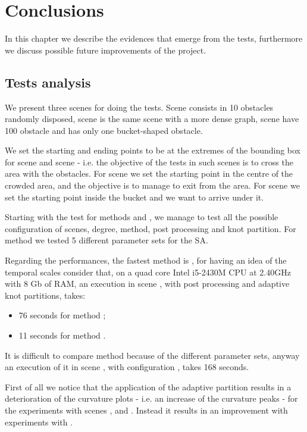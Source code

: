 \documentclass[dissertation.tex]{subfiles}
\begin{document}
\chapter{Conclusions}\label{cha:conclusions}
In this chapter we describe the evidences that emerge from the tests,
furthermore we discuss possible future improvements of the project.

\section{Tests analysis}
We present three scenes for doing the tests. Scene \sceneA consists
in 10 obstacles randomly disposed, scene \sceneAb is the same scene
with a more dense graph, scene \sceneB have 100 obstacle and \sceneC has
only one bucket-shaped obstacle.

We set the starting and ending points
to be at the extremes of the bounding box for scene \sceneA and scene
\sceneAb - 
i.e. the objective of the tests in such scenes is to cross the area
with the obstacles. For scene \sceneB we set the starting point in the
centre of the crowded area, and the objective is to manage to exit
from the area. For scene \sceneC we set the starting point inside the bucket
and we want to arrive under it.

Starting with the test for methods \metA and \metB, we manage to test
all the possible configuration of scenes, degree, method, post
processing and knot partition. For method \metC we tested 5 different
parameter sets for the \ac{SA}.

Regarding the performances, the fastest method is \metB, for having an
idea of the temporal scales consider that, on a quad core Intel
i5-2430M CPU at 2.40GHz with 8 Gb of RAM, an execution in scene
\sceneA, with post processing and adaptive knot partitions, takes:
\begin{itemize}
\item 76 seconds for method \metA;
\item 11 seconds for method \metB.
\end{itemize}
It is difficult to compare method \metC because of the different
parameter sets, anyway an execution of it in scene \sceneA, with
configuration \annA, takes 168 seconds.

First of all we notice that the application of the adaptive partition
results in a deterioration of the curvature plots - i.e. an increase
of the curvature peaks - for the experiments with scenes \sceneA,
\sceneAb and \sceneB. Instead it results in an improvement with
experiments with \sceneC.
\end{document}
